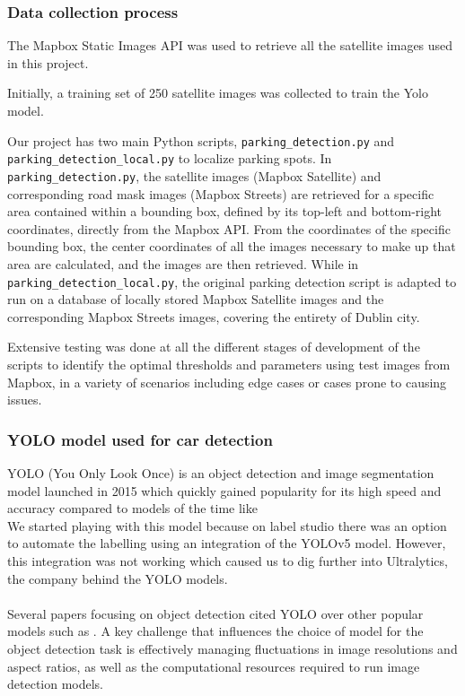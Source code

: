 \subsubsection{Data collection process}
The Mapbox Static Images API was used to retrieve all the satellite images used in this project.

Initially, a training set of 250 satellite images was collected to train the Yolo model.

Our project has two main Python scripts, \texttt{parking\_detection.py} and \texttt{parking\_detection\_local.py} to localize parking spots.
In \texttt{parking\_detection.py}, the satellite images (Mapbox Satellite) and corresponding road mask images (Mapbox Streets) are retrieved for a specific area contained within a bounding box, defined by its top-left and bottom-right coordinates, directly from the Mapbox API.
From the coordinates of the specific bounding box, the center coordinates of all the images necessary to make up that area are calculated, and the images are then retrieved.
While in \texttt{parking\_detection\_local.py}, the original parking detection script is adapted to run on a database of locally stored Mapbox Satellite images and the corresponding Mapbox Streets images, covering the entirety of Dublin city.

Extensive testing was done at all the different stages of development of the scripts to identify the optimal thresholds and parameters using test images from Mapbox, in a variety of scenarios including edge cases or cases prone to causing issues.

\subsubsection{YOLO model used for car detection}
YOLO (You Only Look Once) is an object detection and image segmentation model launched in 2015 which quickly gained popularity for its high speed and accuracy compared to models of the time like \\
We started playing with this model because on label studio there was an option to automate the labelling using an integration of the YOLOv5 model. However, this integration was not working which caused us to dig further into Ultralytics, the company behind the YOLO models.\\ \\
Several papers focusing on object detection cited YOLO over other popular models such as . A key challenge that influences the choice of model for the object detection task is effectively managing fluctuations in image resolutions and aspect ratios, as well as the computational resources required to run image detection models.\\

